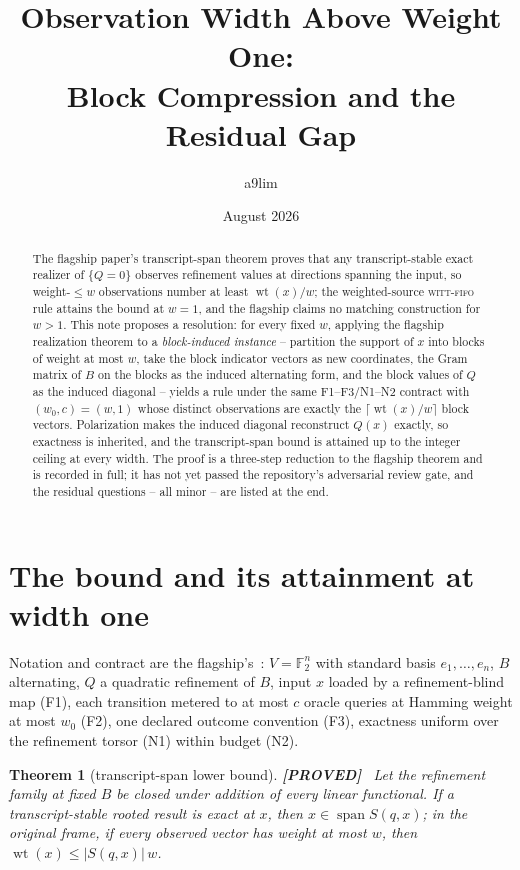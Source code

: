 \documentclass[11pt]{article}
\title{Observation Width Above Weight One:\\
Block Compression and the Residual Gap}
\author{a9lim}
\date{August 2026}
\newtheorem{theorem}{Theorem}
\theoremstyle{definition}
\theoremstyle{remark}
\newcommand{\F}{\mathbb{F}}
\newcommand{\wt}{\operatorname{wt}}
\newcommand{\Span}{\operatorname{span}}
\newcommand{\taglabel}[1]{\textnormal{\textbf{[#1]}}}
\newcommand{\PROVED}{\taglabel{PROVED}}
\begin{document}
\maketitle

\begin{abstract}
The flagship paper's transcript-span theorem proves that any
transcript-stable exact realizer of $\{Q=0\}$ observes refinement values
at directions spanning the input, so weight-$\leq w$ observations number
at least $\wt(x)/w$; the weighted-source \textsc{witt-fifo} rule attains
the bound at $w=1$, and the flagship claims no matching construction for
$w>1$.  This note proposes a resolution: for every fixed $w$, applying
the flagship realization theorem to a \emph{block-induced instance} --
partition the support of $x$ into blocks of weight at most $w$, take the
block indicator vectors as new coordinates, the Gram matrix of $B$ on
the blocks as the induced alternating form, and the block values of $Q$
as the induced diagonal -- yields a rule under the same
F1--F3/N1--N2 contract with $(w_0,c)=(w,1)$ whose distinct observations
are exactly the $\lceil\wt(x)/w\rceil$ block vectors.  Polarization makes
the induced diagonal reconstruct $Q(x)$ exactly, so exactness is
inherited, and the transcript-span bound is attained up to the integer
ceiling at every width.  The proof is a three-step reduction to the
flagship theorem and is recorded in full; it has not yet passed the
repository's adversarial review gate, and the residual questions --
all minor -- are listed at the end.
\end{abstract}

\section{The bound and its attainment at width one}

Notation and contract are the flagship's~\cite{goldarf}: $V=\F_2^n$ with
standard basis $e_1,\dots,e_n$, $B$ alternating, $Q$ a quadratic
refinement of $B$, input $x$ loaded by a refinement-blind map (F1), each
transition metered to at most $c$ oracle queries at Hamming weight at
most $w_0$ (F2), one declared outcome convention (F3), exactness uniform
over the refinement torsor (N1) within budget (N2).

\begin{theorem}[transcript-span lower bound]\label{thm:span}
\PROVED~\cite[transcript-span theorem]{goldarf}
Let the refinement family at fixed $B$ be closed under addition of every
linear functional.  If a transcript-stable rooted result is exact at
$x$, then $x\in\Span S(q,x)$; in the original frame, if every observed
vector has weight at most $w$, then $\wt(x)\leq|S(q,x)|\,w$.
\end{theorem}
\end{document}
